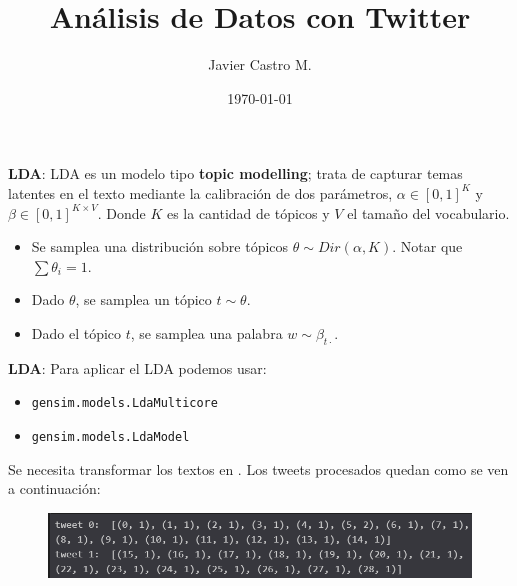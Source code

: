 \documentclass{beamer}
\title[Análisis de Datos con Twitter]{Análisis de Datos con Twitter}
\author{Javier Castro M.}
\institute{Universidad De Chile}
\date{\today}
\begin{document}
	
	\maketitle
	
	\begin{frame}{\textbf{LDA}: }
		LDA es un modelo tipo \textbf{topic modelling}; trata de capturar temas latentes en el texto mediante la calibración de dos parámetros, $\alpha\in [0,1]^{K}$ y $\beta \in [0,1]^{K\times V}$. Donde $K$ es la cantidad de tópicos y $V$ el tamaño del vocabulario. 
		
		\begin{itemize}
			\item Se samplea una distribución sobre tópicos $\theta\sim Dir(\alpha, K)$. Notar que $\sum \theta_i = 1$.
			\item Dado $\theta$, se samplea un tópico $t\sim\theta$.
			\item Dado el tópico $t$, se samplea una palabra $w\sim\beta_{t\cdot}$.
		\end{itemize}
		
		
	\end{frame}

	\begin{frame}{\textbf{LDA}: }
		Para aplicar el LDA podemos usar:
		\begin{itemize}
			\item \texttt{gensim.models.LdaMulticore}
			\item \texttt{gensim.models.LdaModel} 
		\end{itemize}
		Se necesita transformar los textos en . Los tweets procesados quedan como se ven a continuación:
		
		\begin{figure}[h]
			\centering
			\includegraphics[scale=.5]{../imgs/segunda_avance/bow_tweets_ex.png}
		\end{figure} 
		
	\end{frame}
\end{document}
